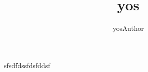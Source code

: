 \documentclass{article}
\begin{document}
\title{yos}
\author{yosAuthor}
\maketitle
sfsdfdssfdsfddsf
\end{document}

